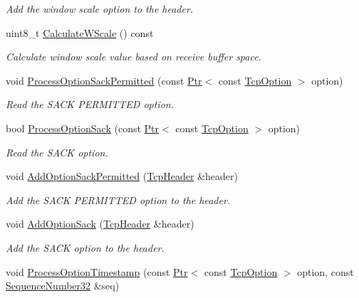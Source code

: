 \begin{DoxyCompactItemize}
\begin{DoxyCompactList}\small\item\em Add the window scale option to the header. \end{DoxyCompactList}\item 
uint8\+\_\+t \hyperlink{classns3_1_1TcpSocketBase_a53856cbb5c7e49324f5428da7b9f0c74}{Calculate\+W\+Scale} () const 
\begin{DoxyCompactList}\small\item\em Calculate window scale value based on receive buffer space. \end{DoxyCompactList}\item 
void \hyperlink{classns3_1_1TcpSocketBase_a9c7dac8b3121549ac801eb0de41801ec}{Process\+Option\+Sack\+Permitted} (const \hyperlink{classns3_1_1Ptr}{Ptr}$<$ const \hyperlink{classns3_1_1TcpOption}{Tcp\+Option} $>$ option)
\begin{DoxyCompactList}\small\item\em Read the S\+A\+CK P\+E\+R\+M\+I\+T\+T\+ED option. \end{DoxyCompactList}\item 
bool \hyperlink{classns3_1_1TcpSocketBase_a0c41c637acc8824e691404f0c9ebe858}{Process\+Option\+Sack} (const \hyperlink{classns3_1_1Ptr}{Ptr}$<$ const \hyperlink{classns3_1_1TcpOption}{Tcp\+Option} $>$ option)
\begin{DoxyCompactList}\small\item\em Read the S\+A\+CK option. \end{DoxyCompactList}\item 
void \hyperlink{classns3_1_1TcpSocketBase_a470e7b2406d76319c457f2fdf5ff0699}{Add\+Option\+Sack\+Permitted} (\hyperlink{classns3_1_1TcpHeader}{Tcp\+Header} \&header)
\begin{DoxyCompactList}\small\item\em Add the S\+A\+CK P\+E\+R\+M\+I\+T\+T\+ED option to the header. \end{DoxyCompactList}\item 
void \hyperlink{classns3_1_1TcpSocketBase_a009a4dcad47330a47e5b829918fb9140}{Add\+Option\+Sack} (\hyperlink{classns3_1_1TcpHeader}{Tcp\+Header} \&header)
\begin{DoxyCompactList}\small\item\em Add the S\+A\+CK option to the header. \end{DoxyCompactList}\item 
void \hyperlink{classns3_1_1TcpSocketBase_af5cc928b5194d832031a1d7ec159f567}{Process\+Option\+Timestamp} (const \hyperlink{classns3_1_1Ptr}{Ptr}$<$ const \hyperlink{classns3_1_1TcpOption}{Tcp\+Option} $>$ option, const \hyperlink{group__network_gacb2070e4e98d2d5135c9bede58f07a03}{Sequence\+Number32} \&seq)

\end{DoxyCompactItemize}
